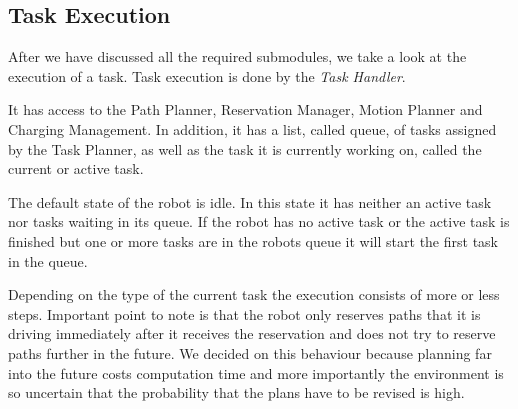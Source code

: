 \documentclass[journal]{IEEEtran}
\begin{document}
\subsection{Task Execution}
\label{subsec:task_execution}
After we have discussed all the required submodules, we take a look at the execution of a task. Task execution is done by the \textit{Task Handler}.

It has access to the Path Planner, Reservation Manager, Motion Planner and Charging Management. In addition, it has a list, called queue, of tasks assigned by the Task Planner, as well as the task it is currently working on, called the current or active task.

The default state of the robot is idle. In this state it has neither an active task nor tasks waiting in its queue. If the robot has no active task or the active task is finished but one or more tasks are in the robots queue it will start the first task in the queue.

Depending on the type of the current task the execution consists of more or less steps. Important point to note is that the robot only reserves paths that it is driving immediately after it receives the reservation and does not try to reserve paths further in the future. We decided on this behaviour because planning far into the future costs computation time and more importantly the environment is so uncertain that the probability that the plans have to be revised is high.
\end{document}
